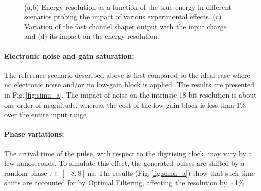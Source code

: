 \begin{figure}[t]
  \centering
  \\
  \caption{(a,b) Energy resolution as a function of the true energy in different scenarios probing the impact of various
           experimental effects. (c) Variation of the fast channel shaper output with the input charge and (d) its impact
           on the energy resolution.\label{fig:simu1}}
\end{figure}

\paragraph*{Electronic noise and gain saturation:} The reference scenario described above is first compared
     to the ideal case where no electronic noise and/or no low-gain block is applied. The results are presented in 
     Fig.\,\ref{fig:simu_a}. The impact of noise on the intrinsic 18-bit resolution is about one order of
     magnitude, whereas the cost of the low gain block is less than 1\% over the entire input range.

\paragraph*{Phase variations:} The arrival time of the pulse, with respect to the digitising clock, may vary 
      by a few nanoseconds. To simulate this effect, the generated pulses are shifted by a random phase 
      $\tau\in[-8,8]$\,ns. The results (Fig.\,\ref{fig:simu_a}) show that such time-shifts are accounted for 
      by Optimal Filtering, affecting the resolution by $\sim$1\%.


